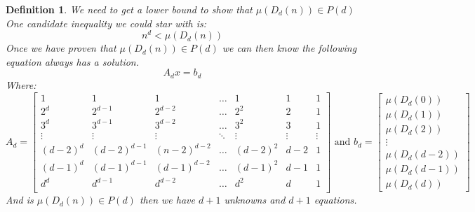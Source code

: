\documentclass[12pt]{extarticle}
\theoremstyle{plain}
\theoremstyle{plain}
\theoremstyle{plain}
\theoremstyle{Definition}
\newtheorem{def.}{Definition}[section]
\theoremstyle{Definition}
\theoremstyle{plain}
\theoremstyle{plain}
\begin{document}
\begin{def.}
	We need to get a lower bound to show that $\mu(D_{d}(n)) \in  P(d)$\\
	One candidate inequality we could star with is: \\
	$$n^d < \mu(D_{d}(n))$$
	Once we have proven that $\mu(D_{d}(n)) \in P(d)$ we can then know the following equation always has a solution. \\ 
	$$A_d x = b_d$$
	Where: 
	$$A_d = 
	\begin{bmatrix}
	1 & 1 & 1 & \hdots & 1 & 1 & 1 \\
	 2^d  & 2^{d-1}  & 2^{d-2}  &  \hdots & 2^2 & 2 & 1 \\
	 3^d  & 3^{d-1}  & 3^{d-2}  &  \hdots & 3^2 & 3 & 1 \\
	\vdots & \vdots & \vdots & \ddots & \vdots & \vdots & \vdots \\
	(d-2)^d & (d-2)^{d-1} & (n-2)^{d-2} & \hdots & (d-2)^2 & d-2 & 1\\ 
	(d-1)^d & (d-1)^{d-1} & (d-1)^{d-2} & \hdots & (d-1)^2 & d-1 & 1\\ 
	d^d & d^{d-1} & d^{d-2} & \hdots & d^2 & d & 1\\ 
	\end{bmatrix} 
	\text{ and } 
	b_d = 
	\begin{bmatrix}
	\mu(D_{d}(0)) \\
	\mu(D_{d}(1)) \\ 
	\mu(D_{d}(2)) \\ 
	\vdots \\ 
	\mu(D_{d}(d-2)) \\ 
	\mu(D_{d}(d-1)) \\ 
	\mu(D_{d}(d))   
	\end{bmatrix}
	$$
	And is $\mu(D_{d}(n)) \in P(d)$ then we have $d+1$ unknowns and $d+1$ equations. \\ 
	
\end{def.}
\end{document}
